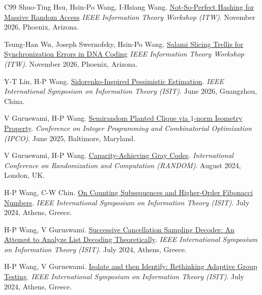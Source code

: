 \documentclass{article}
\def\sec#1{\vskip1em\textbf{\fs1#1}}
\def\fs#1{%
        \pgfmathsetmacro\a{#1}%
        \pgfmathsetmacro\A{\parskip*(4/3)^\a}%
        \pgfmathsetmacro\B{\A*(4/3)}%
        \fontsize{\A pt}{\B pt}\selectfont%
    }
\begin{document}
\bgroup
\def\section#1#2{\sec{Peer-Reviewed Conference Publications \mdseries (new to old)}}
\begin{thebibliography}{C99}
    Shuo-Ting Hsu, Hsin-Po Wang, I-Hsiang Wang.
    \href{simple.one}
    {Not-So-Perfect Hashing for Massive Random Access}
    \emph{IEEE Information Theory Workshop (ITW)}.
    November 2026, Phoenix, Arizona.

    Tsung-Han Wu, Joseph Swernofsky, Hsin-Po Wang.
    \href{simple.one}
    {Salami Slicing Trellis for Synchronization Errors in DNA Coding}
    \emph{IEEE Information Theory Workshop (ITW)}.
    November 2026, Phoenix, Arizona.

    Y-T Lin, H-P Wang.
    \href{https://arxiv.org/abs/2604.14647}
    {Sidorenko-Inspired Pessimistic Estimation}.
    \emph{IEEE International Symposium on Information Theory (ISIT)}.
    June 2026, Guangzhou, China.

    V Guruswami, H-P Wang.
    \href{https://doi.org/10.1007/978-3-031-93112-3_20}
    {Semirandom Planted Clique via $1$-norm Isometry Property}.
    \emph{Conference on Integer Programming and Combinatorial Optimization (IPCO)}.
    June 2025, Baltimore, Maryland.
    
    V Guruswami, H-P Wang.
    \href{https://doi.org/10.4230/LIPIcs.APPROX/RANDOM.2024.65}
    {Capacity-Achieving Gray Codes}.
    \emph{International Conference on Randomization and Computation (RANDOM)}.
    August 2024, London, UK.

    H-P Wang, C-W Chin.
    \href{https://doi.org/10.1109/ISIT57864.2024.10619178}
    {On Counting Subsequences and Higher-Order Fibonacci Numbers}.
    \emph{IEEE International Symposium on Information Theory (ISIT)}.
    July 2024, Athens, Greece.
 
    H-P Wang, V Guruswami.
    \href{https://doi.org/10.1109/ISIT57864.2024.10619251}
    {Successive Cancellation Sampling Decoder: An Attempt to Analyze List Decoding Theoretically}.
    \emph{IEEE International Symposium on Information Theory (ISIT)}.
    July 2024, Athens, Greece.
 
    H-P Wang, V Guruswami.
    \href{https://doi.org/10.1109/ISIT57864.2024.10619098}
    {Isolate and then Identify: Rethinking Adaptive Group Testing}.
    \emph{IEEE International Symposium on Information Theory (ISIT)}.
    July 2024, Athens, Greece.


\end{thebibliography}
\end{document}
